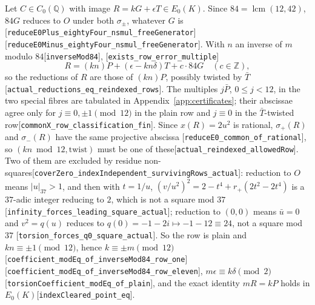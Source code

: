 \documentclass[10pt]{article}
\theoremstyle{definition}
\theoremstyle{remark}
\newcommand{\Q}{\mathbb{Q}}
\newcommand{\Z}{\mathbb{Z}}
\newcommand{\Oinf}{O}
\newcommand{\leanref}[1]{{\scriptsize\textup{[\texttt{#1}]}}\allowbreak}
\begin{document}
Let $C\in C_0(\Q)$ with image $R=kG+\epsilon T\in E_0(K)$.  Since
$84=\operatorname{lcm}(12,42)$, $84G$ reduces to $\Oinf$ under both
$\sigma_\pm$, whatever $G$ is
\leanref{reduce\allowbreak E0\allowbreak Plus\_\allowbreak eighty\allowbreak Four\_\allowbreak nsmul\_\allowbreak free\allowbreak Generator} \leanref{reduce\allowbreak E0\allowbreak Minus\_\allowbreak eighty\allowbreak Four\_\allowbreak nsmul\_\allowbreak free\allowbreak Generator}.
With $n$ an inverse of $m$ modulo $84$\leanref{inverse\allowbreak Mod84},
\leanref{exists\_\allowbreak row\_\allowbreak error\_\allowbreak multiple}
\[
 R=(kn)P+(\epsilon-kn\delta)T+c\cdot84G\quad(c\in\Z),
\]
so the reductions of $R$ are those of $(kn)P$, possibly twisted by $\bar T$
\leanref{actual\_\allowbreak reductions\_\allowbreak eq\_\allowbreak reindexed\_\allowbreak rows}.  The multiples $j\bar P$,
$0\le j<12$, in the two special fibres are tabulated in
Appendix~\ref{app:certificates}; their abscissae agree only for
$j\equiv0,\pm1\pmod{12}$ in the plain row and $j\equiv0$ in the $\bar T$-twisted
row\leanref{common\allowbreak X\_\allowbreak row\_\allowbreak classification\_\allowbreak fin}.  Since $x(R)=2u^2$ is
rational, $\sigma_+(R)$ and $\sigma_-(R)$ have the same projective abscissa
\leanref{reduce\allowbreak E0\_\allowbreak common\_\allowbreak of\_\allowbreak rational}, so $(kn\bmod12,\text{twist})$ must be
one of these\leanref{actual\_\allowbreak reindexed\_\allowbreak allowed\allowbreak Row}.  Two of them are excluded
by residue non-squares\leanref{cover\allowbreak Zero\_\allowbreak index\allowbreak Independent\_\allowbreak surviving\allowbreak Rows\_\allowbreak actual}:
reduction to $\Oinf$ means $|u|_{37}>1$, and then with $t=1/u$,
$(v/u^2)^2=2-t^4+r_+(2t^2-2t^4)$ is a $37$-adic integer reducing to $2$, which is
not a square mod $37$\leanref{infinity\_\allowbreak forces\_\allowbreak leading\_\allowbreak square\_\allowbreak actual};
reduction to $(0,0)$ means $\bar u=0$ and $v^2=q(u)$ reduces to
$q(0)=-1-2i\mapsto-1-12\equiv24$, not a square mod $37$
\leanref{torsion\_\allowbreak forces\_\allowbreak q0\_\allowbreak square\_\allowbreak actual}.  So the row is plain and
$kn\equiv\pm1\pmod{12}$, hence $k\equiv\pm m\pmod{12}$
\leanref{coefficient\_\allowbreak mod\allowbreak Eq\_\allowbreak of\_\allowbreak inverse\allowbreak Mod84\_\allowbreak row\_\allowbreak one} \leanref{coefficient\_\allowbreak mod\allowbreak Eq\_\allowbreak of\_\allowbreak inverse\allowbreak Mod84\_\allowbreak row\_\allowbreak eleven},
$m\epsilon\equiv k\delta\pmod2$\leanref{torsion\allowbreak Coefficient\_\allowbreak mod\allowbreak Eq\_\allowbreak of\_\allowbreak plain}, and
the exact identity $mR=kP$ holds in $E_0(K)$\leanref{index\allowbreak Cleared\_\allowbreak point\_\allowbreak eq}.
\end{document}
